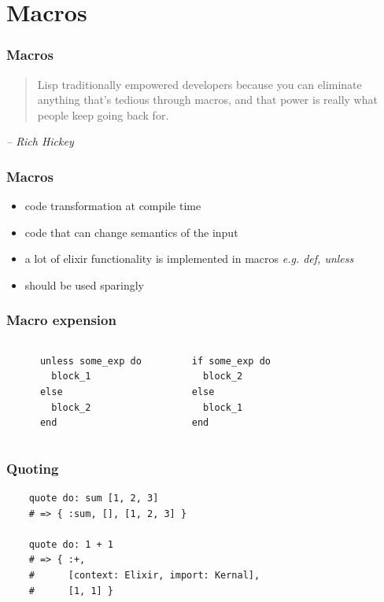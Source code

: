 \documentclass{beamer}
\begin{document}
\section[Section]{Macros}

\begin{frame}
  \frametitle{Macros}
  \begin{quote}
    Lisp traditionally empowered developers because you can eliminate anything
    that's tedious through macros, and that power is really what people
    keep going back for.
  \end{quote}
  \emph{-- Rich Hickey}
\end{frame}

\begin{frame}
  \frametitle{Macros}
  \begin{itemize}
  \item code transformation at compile time
  \item code that can change semantics of the input
  \item a lot of elixir functionality is implemented in macros \textsl{e.g. def, unless}
  \item should be used sparingly
  \end{itemize}
\end{frame}

\begin{frame}[fragile]
  \frametitle{Macro expension}
  \begin{columns}
    \begin{lstlisting}
      unless some_exp do
        block_1
      else
        block_2
      end
    \end{lstlisting}
    \begin{lstlisting}
      if some_exp do
        block_2
      else
        block_1
      end
    \end{lstlisting}
  \end{columns}
\end{frame}

\begin{frame}[fragile]
  \frametitle{Quoting}
  \begin{lstlisting}
    quote do: sum [1, 2, 3]
    # => { :sum, [], [1, 2, 3] }

    quote do: 1 + 1
    # => { :+,
    #      [context: Elixir, import: Kernal],
    #      [1, 1] }
  \end{lstlisting}
\end{frame}
\end{document}
